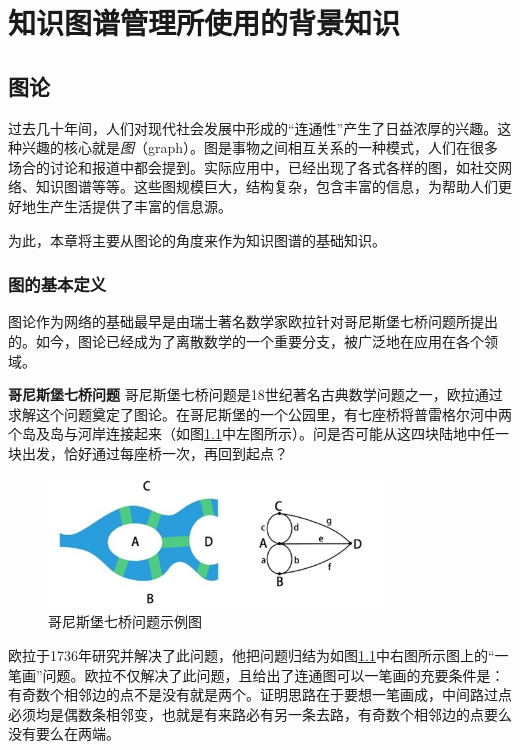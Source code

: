 \chapter{知识图谱管理所使用的背景知识}
\section{图论}
过去几十年间，人们对现代社会发展中形成的``连通性''产生了日益浓厚的兴趣。这种兴趣的核心就是\emph{图}（graph）。图是事物之间相互关系的一种模式，人们在很多场合的讨论和报道中都会提到。实际应用中，已经出现了各式各样的图，如社交网络、知识图谱等等。这些图规模巨大，结构复杂，包含丰富的信息，为帮助人们更好地生产生活提供了丰富的信息源。


为此，本章将主要从图论的角度来作为知识图谱的基础知识。

\subsection{图的基本定义}
图论作为网络的基础最早是由瑞士著名数学家欧拉针对哥尼斯堡七桥问题所提出的。如今，图论已经成为了离散数学的一个重要分支，被广泛地在应用在各个领域。


\begin{example}
\textbf{哥尼斯堡七桥问题}
哥尼斯堡七桥问题是18世纪著名古典数学问题之一，欧拉通过求解这个问题奠定了图论。在哥尼斯堡的一个公园里，有七座桥将普雷格尔河中两个岛及岛与河岸连接起来（如图\ref{fig:graph:KnigsbergBridge}中左图所示）。问是否可能从这四块陆地中任一块出发，恰好通过每座桥一次，再回到起点？

\begin{figure}[htbp]
	\centering\includegraphics[width=3.5in]{./figures/part1/KnigsbergBridge.jpg}
	\caption{哥尼斯堡七桥问题示例图}\label{fig:graph:KnigsbergBridge}
\end{figure}

欧拉于1736年研究并解决了此问题，他把问题归结为如图\ref{fig:graph:KnigsbergBridge}中右图所示图上的``一笔画''问题。欧拉不仅解决了此问题，且给出了连通图可以一笔画的充要条件是：有奇数个相邻边的点不是没有就是两个。证明思路在于要想一笔画成，中间路过点必须均是偶数条相邻变，也就是有来路必有另一条去路，有奇数个相邻边的点要么没有要么在两端。
\end{example}



